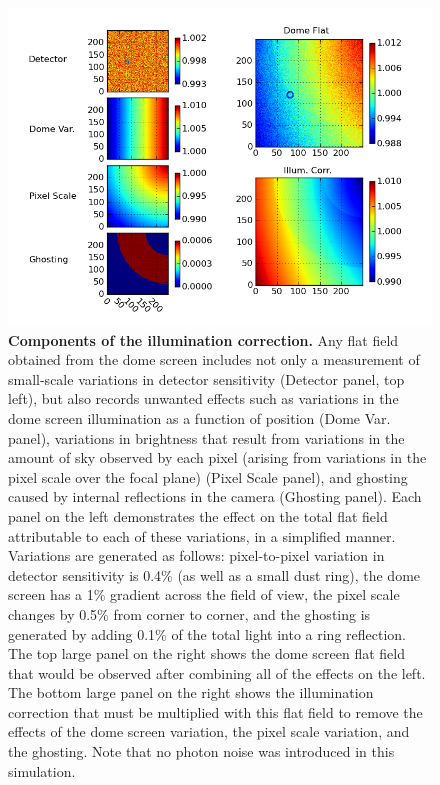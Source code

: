 \documentclass[12pt,preprint]{aastex}
\begin{document}
\begin{figure}[htbp]
\includegraphics[width=6in]{flatfield_corr}
\caption{ {\small
{\bf Components of the illumination correction.}
Any flat field obtained from the dome screen includes not only a
measurement of small-scale variations in detector sensitivity
(Detector panel, top left), but
also records unwanted effects such as variations in the dome screen
illumination as a function of position (Dome Var. panel), variations in brightness that
result from variations in the amount of sky observed by each pixel
(arising from variations in the pixel scale over the focal plane)
(Pixel Scale panel), and
ghosting caused by internal reflections in the camera (Ghosting panel).
Each panel on the left demonstrates the effect on the total flat field
attributable to each of these variations, in a simplified manner. 
Variations are generated as follows: pixel-to-pixel variation in
detector sensitivity is 0.4\% (as well as a small dust ring), the dome
screen has a 1\% gradient across the field of view, the pixel scale
changes by 0.5\% from corner to corner, and the ghosting is generated
by adding 0.1\% of the total light into a ring reflection. 
The top large panel on the right shows the dome screen flat field that
would be observed after combining all of the effects on the left. The bottom large panel on
the right shows the illumination correction that must be multiplied with 
this flat field to remove the effects of the dome screen variation,
the pixel scale variation, and the ghosting.   Note that no photon noise was
introduced in this simulation. }}  \label{fig:flatfield}
\end{figure}
\end{document}
